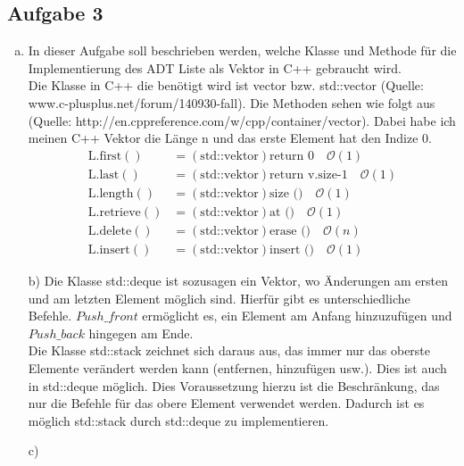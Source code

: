 \documentclass[11pt]{article}
\begin{document}
\subsection*{Aufgabe 3}
\begin{enumerate}[a)]
	\item 
	In dieser Aufgabe soll beschrieben werden, welche Klasse und Methode für die Implementierung des ADT Liste als Vektor in C++ gebraucht wird.\\
	Die Klasse in C++ die benötigt wird ist vector bzw. std::vector (Quelle: www.c-plusplus.net/forum/140930-fall). Die Methoden sehen wie folgt aus (Quelle: http://en.cppreference.com/w/cpp/container/vector). Dabei habe ich meinen C++ Vektor die Länge n und das erste Element hat den Indize 0.
	\begin{align}
	\text{L.first}() &= (\text{std::vektor}) \text{return 0}\quad \mathcal{O}(1)\\
	\text{L.last}() &= (\text{std::vektor}) \text{return v.size-1}\quad \mathcal{O}(1)\\
	\text{L.length}() &= (\text{std::vektor}) \text{size ()}\quad \mathcal{O}(1)\\
	\text{L.retrieve}() &= (\text{std::vektor}) \text{at ()}\quad \mathcal{O}(1)\\
	\text{L.delete}() &= (\text{std::vektor}) \text{erase ()}\quad \mathcal{O}(n)\\
	\text{L.insert}() &= (\text{std::vektor}) \text{insert ()}\quad \mathcal{O}(1)
	\end{align}
	
	\item[b)]
	Die Klasse std::deque ist sozusagen ein Vektor, wo Änderungen am ersten und am letzten Element möglich sind. Hierfür gibt es unterschiedliche Befehle. $Push\_front$ ermöglicht es, ein Element am Anfang hinzuzufügen und $Push\_back$ hingegen am Ende.\\
	Die Klasse std::stack zeichnet sich daraus aus, das immer nur das oberste Elemente verändert werden kann (entfernen, hinzufügen usw.). Dies ist auch in std::deque möglich. Dies Voraussetzung hierzu ist die Beschränkung, das nur die Befehle für das obere Element verwendet werden. Dadurch ist es möglich std::stack durch std::deque zu implementieren.
	
	\item[c)]
	
\end{enumerate}
\end{document}
